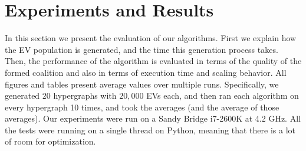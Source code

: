 
\chapter{Experiments and Results} %

\label{Chapter7_results} %








In this section we present the evaluation of our algorithms. First we explain how the EV population is generated, and the time this generation process takes. Then, the performance of the algorithm is evaluated in terms of the quality of the formed coalition and also in terms of execution time and scaling behavior. All figures and tables present average values over multiple runs. Specifically, we generated $20$ hypergraphs  with $20,000$ EVs each, and then ran each algorithm on every hypergraph 10 times, and took the averages (and the average of those averages).
Our experiments were run on a Sandy Bridge i7-2600K at 4.2 GHz. All the tests were running on a single thread on Python, meaning that there is a lot of room for optimization. %

